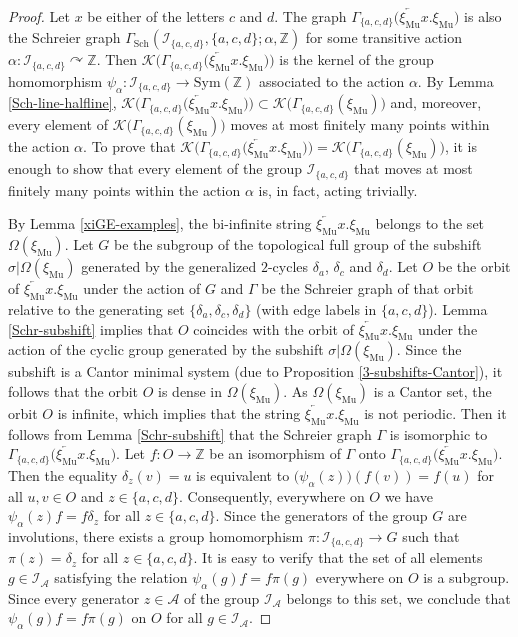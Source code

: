 \documentclass[12pt]{article}
\theoremstyle{definition}
\def\bZ{\mathbb{Z}}
\def\cA{\mathcal{A}}
\def\cI{\mathcal{I}}
\def\cK{\mathcal{K}}
\def\al{\alpha}
\def\de{\delta}
\def\si{\sigma}
\def\Om{\Omega}
\def\xiGE{\xi_{\mathrm{Mu}}}
\def\Sch{\mathop{\mathrm{Sch}}}
\begin{document}
\begin{proof}
Let $x$ be either of the letters $c$ and $d$.  The graph 
$\Gamma_{\{a,c,d\}}\bigl(\overleftarrow{\xiGE}x.\xiGE\bigr)$ is also the 
Schreier graph $\Gamma_{\Sch}(\cI_{\{a,c,d\}},\{a,c,d\};\al,\bZ)$ for some 
transitive action $\al:\cI_{\{a,c,d\}}\curvearrowright\bZ$.  Then 
$\cK\bigl(\Gamma_{\{a,c,d\}}\bigl(\overleftarrow{\xiGE}x.\xiGE\bigr)\bigr)$ 
is the kernel of the group homomorphism $\psi_\al:\cI_{\{a,c,d\}}\to 
\mathrm{Sym}(\bZ)$ associated to the action $\al$.  By Lemma 
\ref{Sch-line-halfline}, 
$\cK\bigl(\Gamma_{\{a,c,d\}}\bigl(\overleftarrow{\xiGE}x.\xiGE\bigr)\bigr) 
\subset\cK\bigl(\Gamma_{\{a,c,d\}}(\xiGE)\bigr)$ and, moreover, 
every element of $\cK\bigl(\Gamma_{\{a,c,d\}}(\xiGE)\bigr)$ moves at most 
finitely many points within the action $\al$.  To prove that 
$\cK\bigl(\Gamma_{\{a,c,d\}}\bigl(\overleftarrow{\xiGE}x.\xiGE\bigr)\bigr)= 
\cK\bigl(\Gamma_{\{a,c,d\}}(\xiGE)\bigr)$, it is enough to show that every 
element of the group $\cI_{\{a,c,d\}}$ that moves at most finitely many 
points within the action $\al$ is, in fact, acting trivially.

By Lemma \ref{xiGE-examples}, the bi-infinite string 
$\overleftarrow{\xiGE}x.\xiGE$ belongs to the set $\Om(\xiGE)$.  Let $G$ be 
the subgroup of the topological full group of the subshift 
$\si|\Omega(\xiGE)$ generated by the generalized $2$-cycles $\de_a$, 
$\de_c$ and $\de_d$.  Let $O$ be the orbit of 
$\overleftarrow{\xiGE}x.\xiGE$ under the action of $G$ and $\Gamma$ be the 
Schreier graph of that orbit relative to the generating set 
$\{\de_a,\de_c,\de_d\}$ (with edge labels in $\{a,c,d\}$).  Lemma 
\ref{Schr-subshift} implies that $O$ coincides with the orbit of 
$\overleftarrow{\xiGE}x.\xiGE$ under the action of the cyclic group 
generated by the subshift $\si|\Omega(\xiGE)$.  Since the subshift is a 
Cantor minimal system (due to Proposition \ref{3-subshifts-Cantor}), it 
follows that the orbit $O$ is dense in $\Om(\xiGE)$.  As $\Om(\xiGE)$ is a 
Cantor set, the orbit $O$ is infinite, which implies that the string 
$\overleftarrow{\xiGE}x.\xiGE$ is not periodic.  Then it follows from Lemma 
\ref{Schr-subshift} that the Schreier graph $\Gamma$ is isomorphic to 
$\Gamma_{\{a,c,d\}}\bigl(\overleftarrow{\xiGE}x.\xiGE\bigr)$.  Let 
$f:O\to\bZ$ be an isomorphism of $\Gamma$ onto 
$\Gamma_{\{a,c,d\}}\bigl(\overleftarrow{\xiGE}x.\xiGE\bigr)$.  Then the 
equality $\de_z(v)=u$ is equivalent to $\bigl(\psi_\al(z)\bigr)(f(v))=f(u)$ 
for all $u,v\in O$ and $z\in\{a,c,d\}$.  Consequently, everywhere on $O$ we 
have $\psi_\al(z)f=f\de_z$ for all $z\in\{a,c,d\}$.  Since the generators 
of the group $G$ are involutions, there exists a group homomorphism 
$\pi:\cI_{\{a,c,d\}}\to G$ such that $\pi(z)=\de_z$ for all 
$z\in\{a,c,d\}$.  It is easy to verify that the set of all elements 
$g\in\cI_{\cA}$ satisfying the relation $\psi_\al(g)f=f\pi(g)$ everywhere 
on $O$ is a subgroup.  Since every generator $z\in\cA$ of the group 
$\cI_{\cA}$ belongs to this set, we conclude that $\psi_\al(g)f=f\pi(g)$ on 
$O$ for all $g\in\cI_{\cA}$.


\end{proof}
\end{document}
